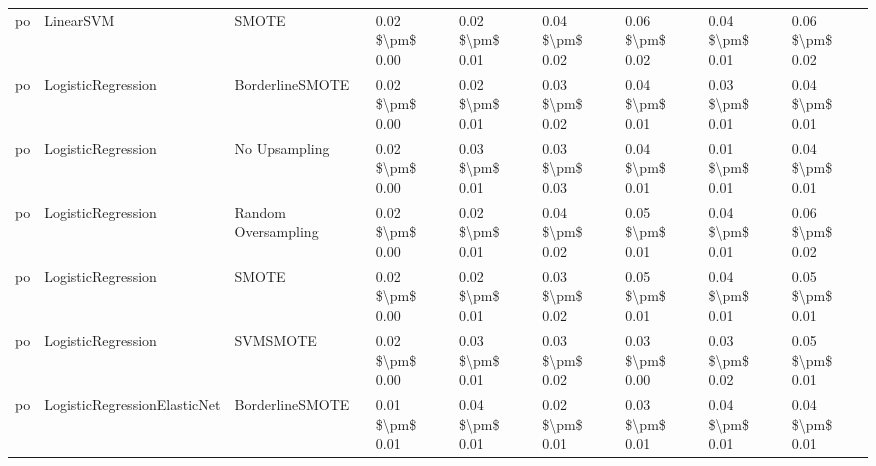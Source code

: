 \begin{tabular}{lllllllll}
      po &                       LinearSVM &                         SMOTE & 0.02 \$\textbackslash pm\$ 0.00 &           0.02 \$\textbackslash pm\$ 0.01 &       0.04 \$\textbackslash pm\$ 0.02 &        0.06 \$\textbackslash pm\$ 0.02 &                         0.04 \$\textbackslash pm\$ 0.01 &     0.06 \$\textbackslash pm\$ 0.02 \\
      po &              LogisticRegression &               BorderlineSMOTE & 0.02 \$\textbackslash pm\$ 0.00 &           0.02 \$\textbackslash pm\$ 0.01 &       0.03 \$\textbackslash pm\$ 0.02 &        0.04 \$\textbackslash pm\$ 0.01 &                         0.03 \$\textbackslash pm\$ 0.01 &     0.04 \$\textbackslash pm\$ 0.01 \\
      po &              LogisticRegression &                 No Upsampling & 0.02 \$\textbackslash pm\$ 0.00 &           0.03 \$\textbackslash pm\$ 0.01 &       0.03 \$\textbackslash pm\$ 0.03 &        0.04 \$\textbackslash pm\$ 0.01 &                         0.01 \$\textbackslash pm\$ 0.01 &     0.04 \$\textbackslash pm\$ 0.01 \\
      po &              LogisticRegression &           Random Oversampling & 0.02 \$\textbackslash pm\$ 0.00 &           0.02 \$\textbackslash pm\$ 0.01 &       0.04 \$\textbackslash pm\$ 0.02 &        0.05 \$\textbackslash pm\$ 0.01 &                         0.04 \$\textbackslash pm\$ 0.01 &     0.06 \$\textbackslash pm\$ 0.02 \\
      po &              LogisticRegression &                         SMOTE & 0.02 \$\textbackslash pm\$ 0.00 &           0.02 \$\textbackslash pm\$ 0.01 &       0.03 \$\textbackslash pm\$ 0.02 &        0.05 \$\textbackslash pm\$ 0.01 &                         0.04 \$\textbackslash pm\$ 0.01 &     0.05 \$\textbackslash pm\$ 0.01 \\
      po &              LogisticRegression &                      SVMSMOTE & 0.02 \$\textbackslash pm\$ 0.00 &           0.03 \$\textbackslash pm\$ 0.01 &       0.03 \$\textbackslash pm\$ 0.02 &        0.03 \$\textbackslash pm\$ 0.00 &                         0.03 \$\textbackslash pm\$ 0.02 &     0.05 \$\textbackslash pm\$ 0.01 \\
      po &    LogisticRegressionElasticNet &               BorderlineSMOTE & 0.01 \$\textbackslash pm\$ 0.01 &           0.04 \$\textbackslash pm\$ 0.01 &       0.02 \$\textbackslash pm\$ 0.01 &        0.03 \$\textbackslash pm\$ 0.01 &                         0.04 \$\textbackslash pm\$ 0.01 &     0.04 \$\textbackslash pm\$ 0.01 \\

\end{tabular}
